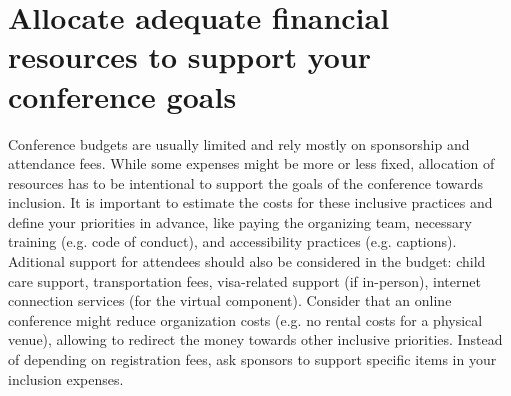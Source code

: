 \documentclass[10pt,letterpaper]{article}
\begin{document}


\section{Allocate adequate financial resources to support your conference goals}
\label{rule_financial}

Conference budgets are usually limited and rely mostly on sponsorship and attendance fees. 
While some expenses might be more or less fixed, %
allocation of resources has to be intentional to support the goals of the conference towards inclusion. 
It is important to estimate the costs for these inclusive practices and define your priorities in advance, like paying the organizing team, necessary training (e.g. code of conduct), and accessibility practices (e.g. captions). 
Aditional support for attendees should also be considered in the budget: child care support, transportation fees, visa-related support (if in-person), internet connection services (for the virtual component). 
Consider that an online conference might reduce organization costs (e.g. no rental costs for a physical venue), allowing to redirect the money towards other inclusive priorities. 
Instead of depending on registration fees, ask sponsors to support specific items in your inclusion expenses.
\end{document}
